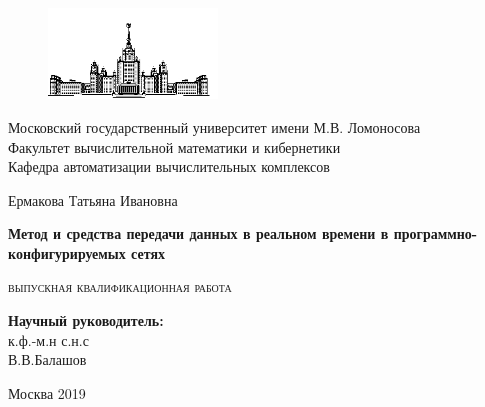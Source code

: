 \documentclass[12pt,fleqn]{article}
\begin{document}
\sloppy
	
\begin{titlepage}
\newpage
		
\begin{figure}[t]
	\centering
	\includegraphics[width=0.4\textwidth]{img/mgu}
\end{figure}
		
\begin{center}
Московский государственный университет имени М.В. Ломоносова \\
Факультет вычислительной математики и кибернетики \\
Кафедра автоматизации вычислительных комплексов \\
\end{center}
		
\vspace{6em}
\begin{center}
\large
Ермакова Татьяна Ивановна
\end{center}
		
\begin{center}
\Large
\bfseries
Метод и средства передачи данных в реальном времени в программно-конфигурируемых сетях
\end{center}

\begin{center}
\large
\textsc{
	выпускная квалификационная работа
}
\end{center}

\vspace{4em}
\begin{flushright}
	\textbf{Научный руководитель:}\\
	к.ф.-м.н с.н.с\\
	В.В.Балашов\\
\end{flushright}%


\vspace{\fill}
\begin{center}
Москва 2019
\end{center}
		
\end{titlepage}


\renewcommand{\contentsname}{Содержание}
\tableofcontents
\end{document}
